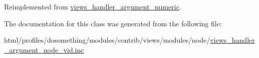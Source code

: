 Reimplemented from \hyperlink{classviews__handler__argument__numeric_a5c6f566b06bad6057e92f15d82311c7b}{views\_\-handler\_\-argument\_\-numeric}.

The documentation for this class was generated from the following file:\begin{DoxyCompactItemize}
\item 
html/profiles/dosomething/modules/contrib/views/modules/node/\hyperlink{views__handler__argument__node__vid_8inc}{views\_\-handler\_\-argument\_\-node\_\-vid.inc}\end{DoxyCompactItemize}
